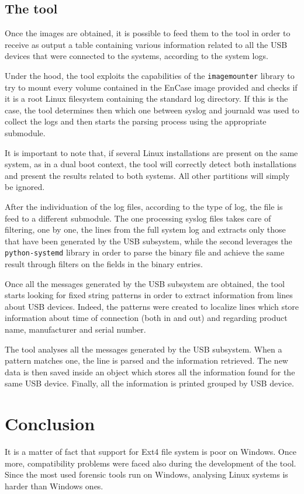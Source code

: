 \documentclass[a4paper]{article}
\begin{document}
\subsection{The tool}\label{sec:tool}
Once the images are obtained, it is possible to feed them to the tool in order
to receive as output a table containing various information related to all the
USB devices that were connected to the systems, according to the system logs.

Under the hood, the tool exploits the capabilities of the \texttt{imagemounter}
library to try to mount every volume contained in the EnCase image provided and
checks if it is a root Linux filesystem containing the standard log directory.
If this is the case, the tool determines then which one between syslog and
journald was used to collect the logs and then starts the parsing process using
the appropriate submodule.

It is important to note that, if several Linux installations are present on the
same system, as in a dual boot context, the tool will correctly detect both
installations and present the results related to both systems. All other
partitions will simply be ignored.

After the individuation of the log files, according to the type of log, the
file is feed to a different submodule. The one processing syslog files takes
care of filtering, one by one, the lines from the full system log and extracts
only those that have been generated by the USB subsystem, while the second
leverages the \texttt{python-systemd} library in order to parse the binary file
and achieve the same result through filters on the fields in the binary
entries.

Once all the messages generated by the USB subsystem are obtained, the tool
starts looking for fixed string patterns in order to extract information from
lines about USB devices. Indeed, the patterns were created to localize lines
which store information about time of connection (both in and out) and
regarding product name, manufacturer and serial number.

The tool analyses all the messages generated by the USB subsystem. When a
pattern matches one, the line is parsed and the information retrieved. The new
data is then saved inside an object which stores all the information found for
the same USB device. Finally, all the information is printed grouped by USB
device.

\section{Conclusion}
\label{sec:concl}
It is a matter of fact that support for Ext4 file system is poor on Windows.
Once more, compatibility problems were faced also during the development of the
tool. Since the most used forensic tools run on Windows, analysing Linux
systems is harder than Windows ones.
\end{document}
